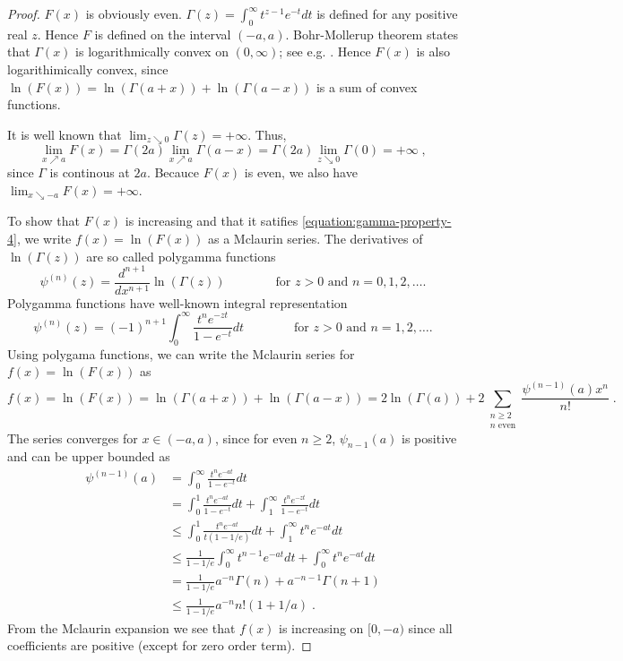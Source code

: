 \begin{proof}
$F(x)$ is obviously even. $\Gamma(z) = \int_0^\infty t^{z-1} e^{-t} dt$ is
defined for any positive real $z$. Hence $F$ is defined on the interval $(-a,a)$. Bohr-Mollerup theorem
states that $\Gamma(x)$ is logarithmically convex on $(0,\infty)$; see e.g.
\cite[Chapter 2]{Artin64}. Hence $F(x)$ is also logarithimically convex, since
$\ln (F(x)) = \ln(\Gamma(a+x)) + \ln(\Gamma(a-x))$ is a sum of convex functions.

It is well known that $\lim_{z \searrow 0} \Gamma(z) = +\infty$. Thus,
$$
\lim_{x \nearrow a} F(x)
= \Gamma(2a) \lim_{x \nearrow a} \Gamma(a-x)
= \Gamma(2a) \lim_{z \searrow 0} \Gamma(0)
= + \infty \; ,
$$
since $\Gamma$ is continous at $2a$. Becauce $F(x)$ is even, we also have
$\lim_{x \searrow -a} F(x) = +\infty$.

To show that $F(x)$ is increasing and that it satifies
\eqref{equation:gamma-property-4}, we write $f(x) = \ln(F(x))$ as a Mclaurin series.
The derivatives of $\ln(\Gamma(z))$ are so called polygamma functions
$$
\psi^{(n)}(z) = \frac{d^{n+1}}{dx^{n+1}} \ln(\Gamma(z))
\qquad \qquad \text{for $z > 0$ and $n=0,1,2,\dots$.}
$$
Polygamma functions have well-known integral representation
$$
\psi^{(n)}(z) = (-1)^{n+1} \int_0^\infty \frac{t^n e^{-zt}}{1 - e^{-t}} dt
\qquad \qquad \text{for $z > 0$ and $n=1,2,\dots$.}
$$
Using polygama functions, we can write the Mclaurin series for $f(x) = \ln(F(x))$ as
$$
f(x) = \ln(F(x)) = \ln(\Gamma(a+x)) + \ln(\Gamma(a-x)) = 2 \ln(\Gamma(a)) + 2 \sum_{\substack{n \ge 2 \\ \text{$n$ even}}} \frac{\psi^{(n-1)}(a) x^n}{n!} \; .
$$
The series converges for $x \in (-a,a)$, since
for even $n \ge 2$, $\psi_{n-1}(a)$ is positive and can be upper bounded as
\begin{align*}
\psi^{(n-1)}(a)
& = \int_0^\infty \frac{t^n e^{-at}}{1 - e^{-t}} dt \\
& = \int_0^1 \frac{t^n e^{-at}}{1 - e^{-t}} dt + \int_1^\infty \frac{t^n e^{-zt}}{1 - e^{-t}} dt \\
& \le \int_0^1 \frac{t^n e^{-at}}{t(1 - 1/e)} dt + \int_1^\infty t^n e^{-at} dt \\
& \le \frac{1}{1 - 1/e} \int_0^\infty t^{n-1} e^{-at} dt + \int_0^\infty t^n e^{-at} dt \\
& = \frac{1}{1 - 1/e} a^{-n} \Gamma(n) + a^{-n-1} \Gamma(n+1) \\
& \le \frac{1}{1 - 1/e} a^{-n} n! (1 + 1/a) \; .
\end{align*}
From the Mclaurin expansion we see that $f(x)$ is increasing on $[0,-a)$
since all coefficients are positive (except for zero order term).


\end{proof}
